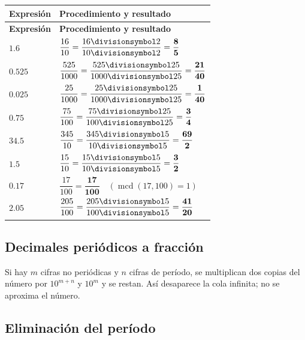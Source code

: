 \documentclass[spanish,letterpaper,oneside]{article}
\let\div\divisionsymbol
\begin{document}
{\small{}\renewcommand{\arraystretch}{1.3}
\begin{longtable}{|>{\raggedright\arraybackslash}p{}|>{\raggedright\arraybackslash}p{}|}\hline
\rowcolor{iiiepePale} \textbf{Expresión} & \textbf{Procedimiento y resultado} \\\hline
\endfirsthead
\hline
\rowcolor{iiiepePale} \textbf{Expresión} & \textbf{Procedimiento y resultado} \\\hline
\endhead
$1.6$ & $\dfrac{16}{10}=\dfrac{16\div 2}{10\div 2}=\mathbf{\dfrac{8}{5}}$ \\\hline
$0.525$ & $\dfrac{525}{1000}=\dfrac{525\div 25}{1000\div 25}=\mathbf{\dfrac{21}{40}}$ \\\hline
$0.025$ & $\dfrac{25}{1000}=\dfrac{25\div 25}{1000\div 25}=\mathbf{\dfrac{1}{40}}$ \\\hline
$0.75$ & $\dfrac{75}{100}=\dfrac{75\div 25}{100\div 25}=\mathbf{\dfrac{3}{4}}$ \\\hline
$34.5$ & $\dfrac{345}{10}=\dfrac{345\div 5}{10\div 5}=\mathbf{\dfrac{69}{2}}$ \\\hline
$1.5$ & $\dfrac{15}{10}=\dfrac{15\div 5}{10\div 5}=\mathbf{\dfrac{3}{2}}$ \\\hline
$0.17$ & $\dfrac{17}{100}=\mathbf{\dfrac{17}{100}}\quad (\operatorname{mcd}(17,100)=1)$ \\\hline
$2.05$ & $\dfrac{205}{100}=\dfrac{205\div 5}{100\div 5}=\mathbf{\dfrac{41}{20}}$ \\\hline
\end{longtable}}

\subsection*{Decimales periódicos a fracción}
Si hay $m$ cifras no periódicas y $n$ cifras de período, se multiplican dos copias del número por $10^{m+n}$ y $10^m$ y se restan. Así desaparece la cola infinita; no se aproxima el número.
\subsection*{Eliminación del período}
\end{document}

